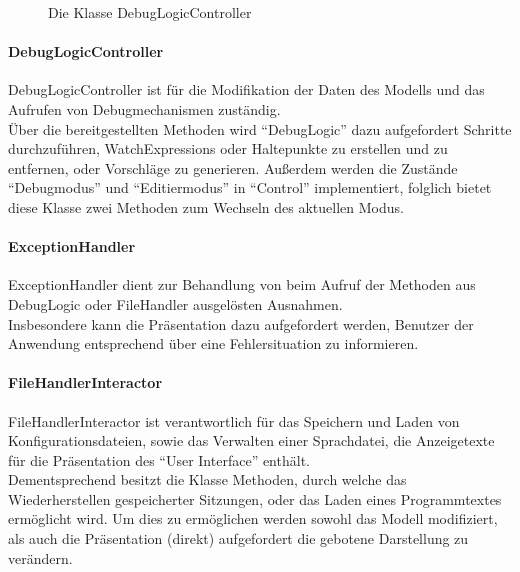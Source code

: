 \documentclass[parskip=full]{scrartcl}
\begin{document}
\begin{figure}[!h]
    \caption{Die Klasse DebugLogicController}
    \label{fig:DebugLogicController}
\end{figure}
\paragraph{DebugLogicController}
    DebugLogicController ist für die Modifikation der Daten des Modells und das Aufrufen von Debugmechanismen zuständig.\\
    Über die bereitgestellten Methoden wird \enquote{DebugLogic} dazu aufgefordert Schritte durchzuführen, WatchExpressions oder Haltepunkte zu erstellen und zu entfernen, oder Vorschläge zu generieren.
    Außerdem werden die Zustände \enquote{Debugmodus} und \enquote{Editiermodus} in \enquote{Control} implementiert, folglich bietet diese Klasse zwei Methoden zum Wechseln des aktuellen Modus.
\paragraph{ExceptionHandler}
    ExceptionHandler dient zur Behandlung von beim Aufruf der Methoden aus DebugLogic oder FileHandler ausgelösten Ausnahmen.\\
    Insbesondere kann die Präsentation dazu aufgefordert werden, Benutzer der Anwendung entsprechend über eine Fehlersituation zu informieren.
\paragraph{FileHandlerInteractor}
    FileHandlerInteractor ist verantwortlich für das Speichern und Laden von Konfigurationsdateien, sowie das Verwalten einer Sprachdatei, die Anzeigetexte für die Präsentation des \enquote{User Interface} enthält.\\
    Dementsprechend besitzt die Klasse Methoden, durch welche das Wiederherstellen gespeicherter Sitzungen, oder das Laden eines Programmtextes ermöglicht wird.
    Um dies zu ermöglichen werden sowohl das Modell modifiziert, als auch die Präsentation (direkt) aufgefordert die gebotene Darstellung zu verändern.
\end{document}
